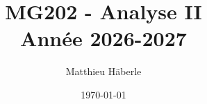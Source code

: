 \documentclass[a4paper, 12pt]{report}
\title{
	{\Huge MG202 - Analyse II \\ }
	{\huge Année 2026-2027}
}
\author{\Large{Matthieu Häberle}}
\date{\today}
\begin{document}
\maketitle
\newpage
\twocolstableofcontents
\pagebreak











\end{document}
